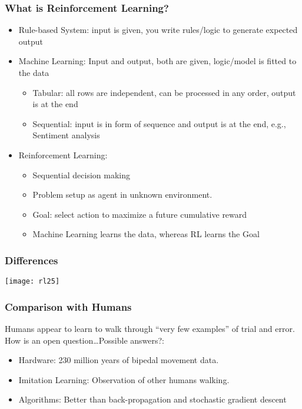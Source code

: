 \begin{frame}[fragile]\frametitle{What is Reinforcement Learning?}

\begin{itemize}
\item Rule-based System: input is given, you write rules/logic to generate expected output
\item Machine Learning: Input and output, both are given, logic/model is fitted to the data
	\begin{itemize}
	\item Tabular: all rows are independent, can be processed in any order, output is at the end
	\item Sequential: input is in form of sequence and output is at the end, e.g., Sentiment analysis
	\end{itemize}
\item Reinforcement Learning: 
	\begin{itemize}
	\item Sequential decision making 
	\item Problem setup as agent in unknown environment. 
	\item Goal: select action to maximize a future cumulative reward
	\item Machine Learning learns the data, whereas RL learns the Goal
	\end{itemize}
\end{itemize}

\end{frame}

\begin{frame}[fragile]\frametitle{Differences}
\begin{center}
\texttt{[image: rl25]}
\end{center}
\end{frame}

\begin{frame}[fragile]\frametitle{Comparison with Humans}

Humans appear to learn to walk through ``very few examples'' of trial and error. How is an open question…Possible answers?:
\begin{itemize}
\item Hardware: 230 million years of bipedal movement data.
\item Imitation Learning: Observation of other humans walking.
\item Algorithms: Better than back-propagation and stochastic gradient descent
\end{itemize}


\end{frame}



